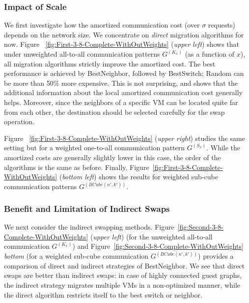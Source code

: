 \documentclass[conference]{IEEEtran}
\def\BC#1#2{BCube(#1,#2)}
\begin{document}
\subsubsection{Impact of Scale}

We first investigate how the amortized communication cost (over $\sigma$ requests) depends on the network size. We concentrate on \emph{direct} migration algorithms
for now.
Figure ~\ref{fig:First-3-8-Complete-WithOutWeights} (\emph{upper left}) shows that under unweighted all-to-all communication patterns $G^{(K_{x})}$ (as a function of $x$), all migration algorithms strictly improve the
amortized cost. The best performance is achieved by {\sc BestNeighbor}, followed by  {\sc BestSwitch}; {\sc Random} can be more than 50\% more expensive. This is not surprising, and shows that the additional information about the local amortized communication cost generally helps.
Moreover, since the neighbors of a specific VM can be located quite far from each other, the destination should be selected carefully for the swap operation.

Figure ~\ref{fig:First-3-8-Complete-WithOutWeights} (\emph{upper right}) studies the same setting but for a weighted one-to-all communication pattern $G^{(S_{x})}$. While the amortized costs are generally slightly lower in this case, the order of the algorithms is the same as before.
Finally, Figure~\ref{fig:First-3-8-Complete-WithOutWeights} (\emph{bottom left}) shows the results for weighted sub-cube communication patterns $G^{(\BC{n'}{k'})}$.


\subsubsection{Benefit and Limitation of Indirect Swaps}

We next consider the indirect swapping methods. Figure~\ref{fig:Second-3-8-Complete-WithOutWeights} (\emph{upper left}) (for the unweighted all-to-all communication $G^{(K_{x})}$)  and Figure~\ref{fig:Second-3-8-Complete-WithOutWeights} \emph{bottom} (for a weighted sub-cube communication $G^{(\BC{n'}{k'})}$)  provides a comparison of direct and indirect strategies of {\sc BestNeighbor}.
We see that direct swaps are better than indirect swaps: in case of highly connected guest graphs, the indirect strategy
migrates multiple VMs in a non-optimized manner, while the direct algorithm restricts itself to the best switch or neighbor.
\end{document}
